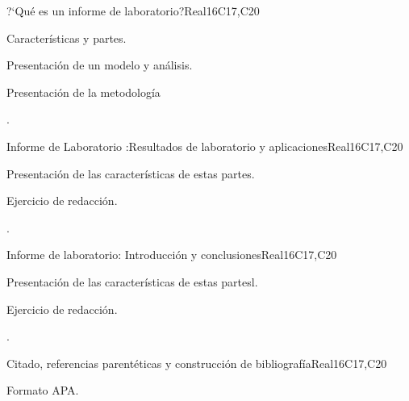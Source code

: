 \begin{syllabus}
\begin{unit}{?`Qué es un informe de laboratorio?}{}{Real}{16}{C17,C20}
  \begin{topics}
      \item Características y partes.
      \item Presentación de un modelo y análisis.
      \item Presentación de la metodología 
  \end{topics}

  \begin{learningoutcomes}
   \item .%
  \end{learningoutcomes}
\end{unit}

\begin{unit}{Informe de Laboratorio :Resultados de laboratorio y aplicaciones}{}{Real}{16}{C17,C20}
  \begin{topics}
      \item Presentación de las características de estas partes.
      \item Ejercicio de redacción.
  \end{topics}

  \begin{learningoutcomes}
   \item .%
  \end{learningoutcomes}
\end{unit}

\begin{unit}{Informe de laboratorio: Introducción y conclusiones}{}{Real}{16}{C17,C20}
  \begin{topics}
      \item Presentación de las características de estas partesl.
      \item Ejercicio de redacción.
  \end{topics}

  \begin{learningoutcomes}
   \item .%
  \end{learningoutcomes}
\end{unit}

\begin{unit}{Citado, referencias parentéticas y construcción de bibliografía}{}{Real}{16}{C17,C20}
  \begin{topics}
      \item Formato APA.
  \end{topics}


\end{unit}
\end{syllabus}
